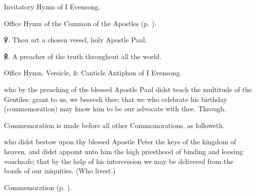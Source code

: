 
\mattins
{}

\begin{rubric}
	Invitatory Hymn of I Evensong.
\end{rubric}

\begin{rubric}
	Office Hymn of the Common of the Apostles (p. \pageref{CommonApostles}).
\end{rubric}

℣. Thou art a chosen vessel, holy Apostle Paul.

℟. A preacher of the truth throughout all the world.


\secondEvensong
{}

\begin{rubric}
	Office Hymn, Versicle, \& Canticle Antiphon of I Evensong.
\end{rubric}

\collect
{} who by the preaching of the blessed Apostle Paul didst teach the multitude of the Gentiles: grant to us, we beseech thee; that we who celebrate his birthday (commemoration) may know him to be our advocate with thee. Through.

\begin{rubric}
	Commemoration  is made before all other Commemorations, as followeth.
\end{rubric}

 who didst bestow upon thy blessed Apostle Peter the keys of the kingdom of heaven, and didst  appoint unto him the high priesthood of binding and loosing: vouchsafe; that by the help of his intercession we may be delivered from the bonds of our iniquities. (Who livest.)

\begin{rubric}
	Commemoration  (p. \pageref{JohnBaptistCollect}).
\end{rubric}


